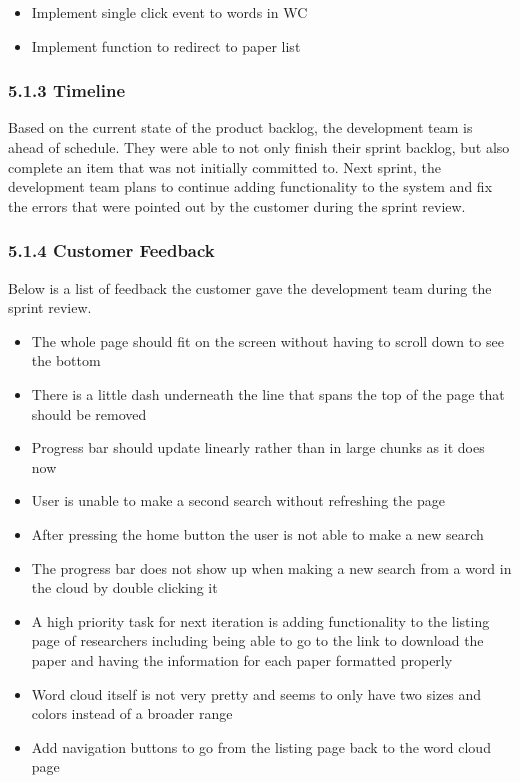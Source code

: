 \documentclass[]{article}
\begin{document}
\begin{itemize}
  \begin{itemize}
  \itemsep1pt\parskip0pt
  \item
    Implement single click event to words in WC
  \item
    Implement function to redirect to paper list
  \end{itemize}
\end{itemize}

\subsubsection{5.1.3 Timeline}\label{timeline}

Based on the current state of the product backlog, the development team
is ahead of schedule. They were able to not only finish their sprint
backlog, but also complete an item that was not initially committed to.
Next sprint, the development team plans to continue adding functionality
to the system and fix the errors that were pointed out by the customer
during the sprint review.

\subsubsection{5.1.4 Customer Feedback}\label{customer-feedback}

Below is a list of feedback the customer gave the development team
during the sprint review.

\begin{itemize}
\itemsep1pt\parskip0pt
\item
  The whole page should fit on the screen without having to scroll down
  to see the bottom
\item
  There is a little dash underneath the line that spans the top of the
  page that should be removed
\item
  Progress bar should update linearly rather than in large chunks as it
  does now
\item
  User is unable to make a second search without refreshing the page
\item
  After pressing the home button the user is not able to make a new
  search
\item
  The progress bar does not show up when making a new search from a word
  in the cloud by double clicking it
\item
  A high priority task for next iteration is adding functionality to the
  listing page of researchers including being able to go to the link to
  download the paper and having the information for each paper formatted
  properly
\item
  Word cloud itself is not very pretty and seems to only have two sizes
  and colors instead of a broader range
\item
  Add navigation buttons to go from the listing page back to the word
  cloud page
\end{itemize}
\end{document}
